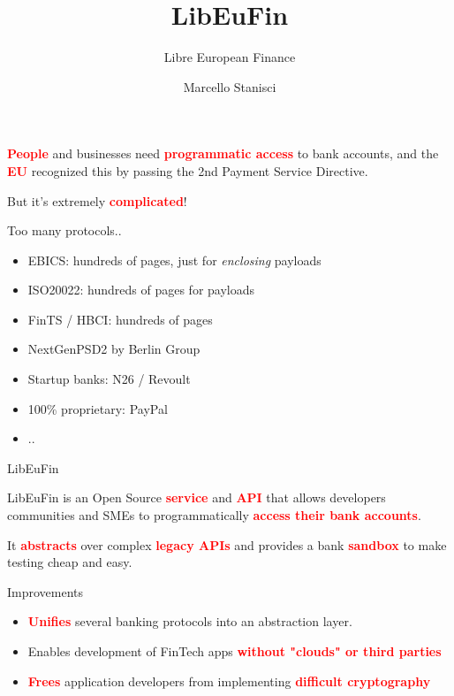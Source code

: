 \documentclass[pdf]{beamer}
\title{LibEuFin}
\subtitle{Libre European Finance}
\author{Marcello Stanisci}
\newcommand{\boldred}[1]{\textcolor{red}{\textbf{#1}}}
\begin{document}
\begin{frame}
  \titlepage
\end{frame}

\begin{frame}
  \begin{center}
  \boldred{People} and businesses need \boldred{programmatic access} to bank accounts, and
  the \boldred{EU} recognized this by passing the 2nd Payment Service Directive.

  But it's extremely \boldred{complicated}!
  \end{center}
\end{frame}

\begin{frame}{Too many protocols..}
  \begin{itemize}
    \item EBICS: hundreds of pages, just for {\it enclosing} payloads
    \item ISO20022: hundreds of pages for payloads
    \item FinTS / HBCI: hundreds of pages
    \item NextGenPSD2 by Berlin Group 
    \item Startup banks: N26 / Revoult
    \item 100\% proprietary: PayPal
    \item ..
  \end{itemize}
\end{frame}

\begin{frame}{LibEuFin}
  \begin{center}
  LibEuFin is an Open Source \boldred{service} and \boldred{API} that allows
  developers communities and SMEs to programmatically \boldred{access their bank accounts}.

  It \boldred{abstracts} over complex \boldred{legacy APIs} and provides a bank \boldred{sandbox}
  to make testing cheap and easy.
  \end{center}
\end{frame}

\begin{frame}{Improvements}
  \begin{itemize}
  \item \boldred{Unifies} several banking protocols into an abstraction layer.
  \item Enables development of FinTech apps \boldred{without "clouds" or third parties}
  \item \boldred{Frees} application developers from implementing \boldred{difficult cryptography}
  \end{itemize}
\end{frame}
\end{document}

